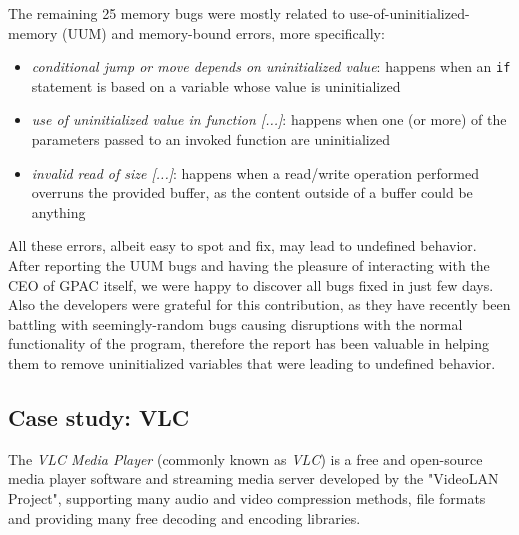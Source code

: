 The remaining 25 memory bugs were mostly related to use-of-uninitialized-memory (UUM) and memory-bound errors, more specifically:
\begin{itemize}
    \item \textit{conditional jump or move depends on uninitialized value}: happens when an \verb|if| statement is based on a variable whose value is uninitialized
    \item \textit{use of uninitialized value in function [...]}: happens when one (or more) of the parameters passed to an invoked function are uninitialized
    \item \textit{invalid read of size [...]}: happens when a read/write operation performed overruns the provided buffer, as the content outside of a buffer could be anything
\end{itemize}

All these errors, albeit easy to spot and fix, may lead to undefined behavior.
After reporting the UUM bugs and having the pleasure of interacting with the CEO of GPAC itself, we were happy to discover all bugs fixed in just few days. Also the developers were grateful for this contribution, as they have recently been battling with seemingly-random bugs causing disruptions with the normal functionality of the program, therefore the report has been valuable in helping them to remove uninitialized variables that were leading to undefined behavior.




\newpage
\subsection{Case study: VLC}
The \textit{VLC Media Player} (commonly known as \textit{VLC}) \cite{vlc} is a free and open-source media player software and streaming media server developed by the "VideoLAN Project", supporting many audio and video compression methods, file formats and providing many free decoding and encoding libraries.

